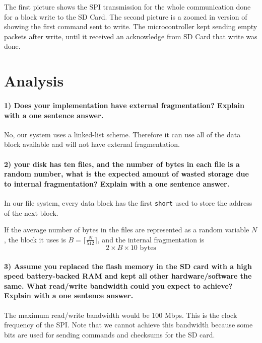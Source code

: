 \documentclass[a4paper]{article}
\newlength{\pic}
\begin{document}
The first picture shows the SPI transmission for the whole communication done for a block write to the SD  Card. The second picture is a zoomed in version of showing the first command sent to write. The microcontroller kept sending empty packets after write, until it received an acknowledge from SD Card that write was done.

\section{Analysis}
\paragraph{1) Does your implementation have external fragmentation? Explain with a one sentence answer.\\}

No, our system uses a linked-list scheme. Therefore it can use all of the data block available and will not have external fragmentation.

\paragraph{2) your disk has ten files, and the number of bytes in each file is a random number, what is the expected 
amount of wasted storage due to internal fragmentation? Explain with a one sentence answer. \\}

In our file system, every data block has the first \texttt{short} used to store the address of the next block.

If the average number of bytes in the files are represented as a random variable $N$,
the block it uses is $B = \lceil \frac{N}{512} \rceil$, and the internal fragmentation is
\begin{equation*}
	2 \times B \times 10 \text{ bytes}
\end{equation*} 

\paragraph{3) Assume you replaced the flash memory in the SD card with a high speed battery-backed RAM and kept all 
other hardware/software the same. What read/write bandwidth could you expect to achieve? Explain with a one 
sentence answer. \\}

The maximum read/write bandwidth would be 100 Mbps. This is the clock frequency of the SPI. Note that we cannot achieve this bandwidth because some bits are used for sending commands and checksums for the SD card.
\end{document}
